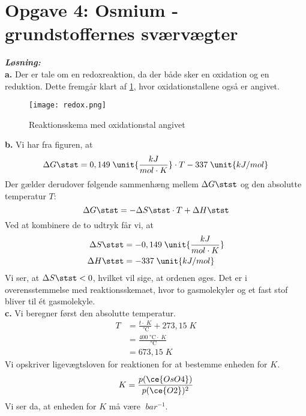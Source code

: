 \documentclass{report}
\newcommand{\sol}{\setlength{\parindent}{0cm}\textbf{\textit{Løsning:}}\setlength{\parindent}{1cm}}
\begin{document}
\section*{Opgave 4: Osmium - grundstoffernes sværvægter}
\sol \\
\textbf{a.}
Der er tale om en redoxreaktion, da der både sker en oxidation og en reduktion.
Dette fremgår klart af \cref{fig:redox}, hvor oxidationstallene også er angivet.
\begin{figure}[H]
\begin{center}
  \texttt{[image: redox.png]}
\end{center}
\caption{Reaktionsskema med oxidationstal angivet}
\label{fig:redox}
\end{figure}
\noindent \textbf{b.}
Vi har fra figuren, at
\[
\Delta G \stst = 0,149 \;\unit{\frac{kJ}{mol \cdot K}} \cdot T -337 \;\unit{kJ/mol} 
\] 
Der gælder derudover følgende sammenhæng mellem $\Delta G \stst $ og den absolutte temperatur $T$:
\[
\Delta G \stst =-\Delta S \stst \cdot T + \Delta H \stst 
\] 
Ved at kombinere de to udtryk får vi, at 
\begin{equation*}
\begin{split}
  \Delta S \stst &= -0,149 \;\unit{\frac{kJ}{mol \cdot K}} \\
  \Delta H \stst &= -337 \;\unit{kJ/mol} 
\end{split}
\end{equation*}
Vi ser, at $\Delta S \stst < 0 $, hvilket vil sige, at ordenen øges.
Det er i overensstemmelse med reaktionsskemaet, hvor to gasmolekyler og et fast stof bliver til ét gasmolekyle.\\[1ex]
\textbf{c.}
Vi beregner først den absolutte temperatur.
\begin{equation*}
\begin{split}
T&=\frac{t \cdot \;\unit{K} }{\;\unit{\celsius} } + 273,15 \;\unit{K} \\
  &=\frac{400 \;\unit{\celsius} \cdot \;\unit{K} }{\;\unit{\celsius} }\\
  &=673,15 \;\unit{K} 
\end{split}
\end{equation*}
Vi opskriver ligevægtsloven for reaktionen for at bestemme enheden for $K$.
\[
K=\frac{p(\ce{OsO4} )}{p(\ce{O2} )^2}
\] 
Vi ser da, at enheden for $K$ må være $\;\unit{bar ^{-1}} $.
\end{document}
